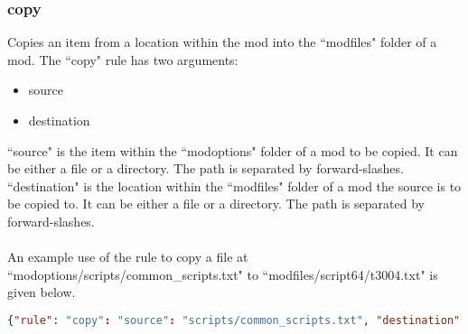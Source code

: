 \documentclass{article}
\begin{document}
\subsubsection{copy}
Copies an item from a location within the mod into the ``modfiles" folder of a mod. The ``copy" rule has two arguments:
\begin{itemize}
\item source
\item destination
\end{itemize}
``source" is the item within the ``modoptions" folder of a mod to be copied. It can be either a file or a directory. The path is separated by forward-slashes.\\
``destination" is the location within the ``modfiles" folder of a mod the source is to be copied to. It can be either a file or a directory. The path is separated by forward-slashes.\\\\
An example use of the rule to copy a file at ``modoptions/scripts/common\_scripts.txt" to ``modfiles/script64/t3004.txt" is given below.
\begin{lstlisting}[language=json,firstnumber=1]
{"rule": "copy": "source": "scripts/common_scripts.txt", "destination": "script64/t3004.txt"}
\end{lstlisting}
\newpage
\end{document}
